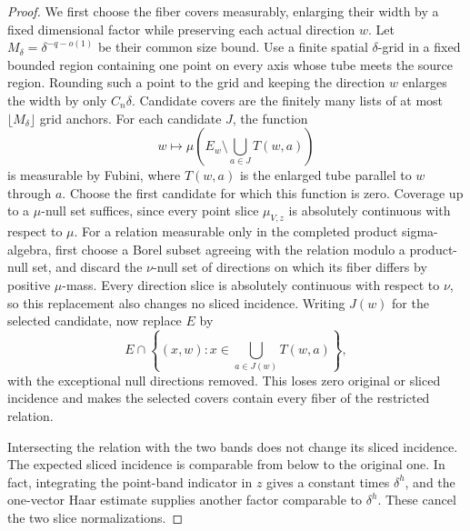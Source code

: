 \begin{proof}
We first choose the fiber covers measurably, enlarging their width by a
fixed dimensional factor while preserving each actual direction $w$.
Let $M_\delta=\delta^{-q-o(1)}$ be their common size bound. Use a finite
spatial $\delta$-grid in a fixed bounded region containing one point on
every axis whose tube meets the source region. Rounding such a point
to the grid and keeping the direction $w$ enlarges the width by only
$C_n\delta$. Candidate covers are the finitely many lists of at most
$\lfloor M_\delta\rfloor$ grid anchors. For each candidate $J$, the
function
\[
 w\longmapsto
 \mu\left(E_w\setminus\bigcup_{a\in J}T(w,a)\right)
\]
is measurable by Fubini, where $T(w,a)$ is the enlarged tube parallel
to $w$ through $a$. Choose the first candidate for which this function
is zero. Coverage up to a $\mu$-null set suffices, since every point
slice $\mu_{V,z}$ is absolutely continuous with respect to $\mu$.
For a relation measurable only in the completed product sigma-algebra,
first choose a Borel subset agreeing with the relation modulo a
product-null set, and discard the $\nu$-null set of
directions on which its fiber differs by positive $\mu$-mass. Every
direction slice is absolutely continuous with respect to $\nu$, so
this replacement also changes no sliced incidence.
Writing $J(w)$ for the selected candidate, now replace $E$ by
\[
 E\cap\left\{(x,w):x\in\bigcup_{a\in J(w)}T(w,a)\right\},
\]
with the exceptional null directions removed. This loses zero original
or sliced incidence and makes the selected covers contain every fiber
of the restricted relation.

Intersecting the relation with the two bands does not change its sliced
incidence. The expected sliced incidence is comparable from below to the
original one. In fact, integrating the point-band indicator in $z$ gives a
constant times $\delta^h$, and the one-vector Haar estimate supplies
another factor comparable to $\delta^h$. These cancel the two slice
normalizations.


\end{proof}
